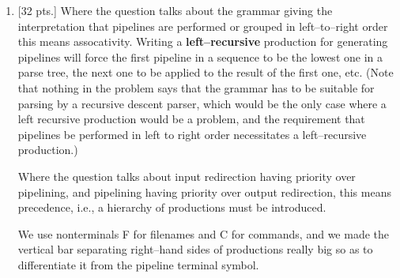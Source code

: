 \documentclass[11pt,fleqn]{article}
\begin{document}
\begin{enumerate}
    \item {[32 pts.]} Where the question talks about the grammar giving the
          interpretation that pipelines are performed or grouped in
          left--to--right order this means assocativity.  Writing a
          \textbf{left--recursive} production for generating pipelines will
          force the first pipeline in a sequence to be the lowest one in a
          parse tree, the next one to be applied to the result of the first
          one, etc.  (Note that nothing in the problem says that the grammar
          has to be suitable for parsing by a recursive descent parser,
          which would be the only case where a left recursive production
          would be a problem, and the requirement that pipelines be
          performed in left to right order necessitates a left--recursive
          production.)

          \renewcommand{\midspc}{\mbox{\huge \ensuremath{\ \mid \ }}}

          \vspace{-3mm}

          \begin{multicols}{2}

            Where the question talks about input redirection having priority
            over pipelining, and pipelining having priority over output
            redirection, this means precedence, i.e., a hierarchy of
            productions must be introduced.

            We use nonterminals F for filenames and C for commands, and we
            made the vertical bar separating right--hand sides of
            productions {\Large really big} so as to differentiate it from
            the pipeline terminal symbol.

            \hspace{.2in}
            \begin{minipage}[t]{2.9in}

              \begin{grammar}[2]

                \production{S}{T \midspc T \ \: \texttt{>} \ \: F}
                \\

                \production{T}{T \ \: \texttt{|\&} \ \: C \midspc U}
                \\

                \production{U}{C \ \: \texttt{<} \ \: F \midspc C}
                \\


\end{grammar}
\end{minipage}
\end{multicols}
\end{enumerate}
\end{document}

